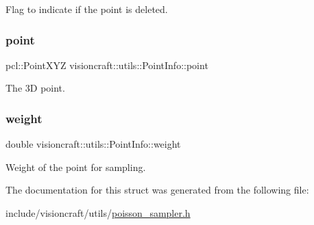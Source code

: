 Flag to indicate if the point is deleted. 

\mbox{\label{structvisioncraft_1_1utils_1_1PointInfo_a3f9d181ac262ed933fc486e765dce83d}} 
\subsubsection{\texorpdfstring{point}{point}}
{\footnotesize\ttfamily pcl\+::\+Point\+X\+YZ visioncraft\+::utils\+::\+Point\+Info\+::point}



The 3D point. 

\mbox{\label{structvisioncraft_1_1utils_1_1PointInfo_aa33bc2994ddc137847329f059c93f032}} 
\subsubsection{\texorpdfstring{weight}{weight}}
{\footnotesize\ttfamily double visioncraft\+::utils\+::\+Point\+Info\+::weight}



Weight of the point for sampling. 



The documentation for this struct was generated from the following file\+:\begin{DoxyCompactItemize}
\item 
include/visioncraft/utils/\hyperlink{poisson__sampler_8h}{poisson\+\_\+sampler.\+h}\end{DoxyCompactItemize}
